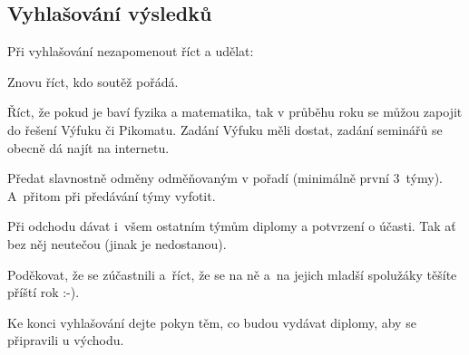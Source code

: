 \documentclass[vyfuk,\classoptions]{fksempty}
\begin{document}
\subsection{Vyhlašování výsledků}

Při vyhlašování nezapomenout říct a udělat:
\begin{compactitem}
	\item Znovu říct, kdo soutěž pořádá.
	\item Říct, že pokud je baví fyzika a matematika, tak v průběhu roku se
	můžou zapojit do řešení Výfuku či Pikomatu. Zadání Výfuku měli dostat,
	zadání seminářů se obecně dá najít na internetu.
	\item Předat slavnostně odměny odměňovaným v pořadí (minimálně první 3~týmy).
	A~přitom při předávání týmy vyfotit.
	\item Při odchodu dávat i~všem ostatním týmům diplomy a potvrzení o účasti. Tak ať bez něj neutečou
	(jinak je nedostanou).
	\item Poděkovat, že se zúčastnili a~říct, že se na ně a~na jejich mladší spolužáky
	těšíte příští rok :-).
\end{compactitem}

\medskip 

Ke konci vyhlašování dejte pokyn těm, co budou vydávat diplomy, aby se připravili u východu.
\end{document}
